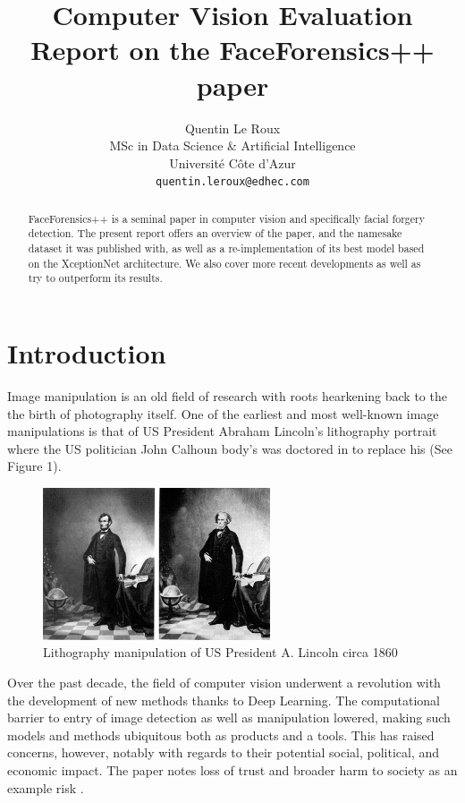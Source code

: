 \documentclass{article} %
\title{Computer Vision Evaluation \\ Report on the FaceForensics++ paper}
\author{Quentin Le Roux \\
MSc in Data Science \& Artificial Intelligence \\
Université Côte d'Azur \\
\texttt{quentin.leroux@edhec.com}}
\begin{document}
\begin{center}
\maketitle
\end{center}

\begin{abstract}
FaceForensics++ is a seminal paper in computer vision and specifically facial forgery detection. The present report offers an overview of the paper, and the namesake dataset it was published with, as well as a re-implementation of its best model based on the XceptionNet architecture. We also cover more recent developments as well as try to outperform its results.
\end{abstract}

\section{Introduction}

Image manipulation is an old field of research with roots hearkening back to the the birth of photography itself. One of the earliest and most well-known image manipulations is that of US President Abraham Lincoln's lithography portrait where the US politician John Calhoun body's was doctored in to replace his (See Figure 1).

\begin{figure}[H]
\begin{center}
\includegraphics[width=0.6\textwidth]{images/lincoln_manip.jpg}
\end{center}
\caption{Lithography manipulation of US President A. Lincoln circa 1860 \citep{PRI}}
\end{figure}

Over the past decade, the field of computer vision underwent a revolution with the development of new methods thanks to Deep Learning. The computational barrier to entry of image detection as well as manipulation lowered, making such models and methods ubiquitous both as products and a tools. This has raised concerns, however, notably with regards to their potential social, political, and economic impact. The paper notes loss of trust and broader harm to society as an example risk \citep{DBLP:journals/corr/abs-1803-09179}. 
\end{document}
